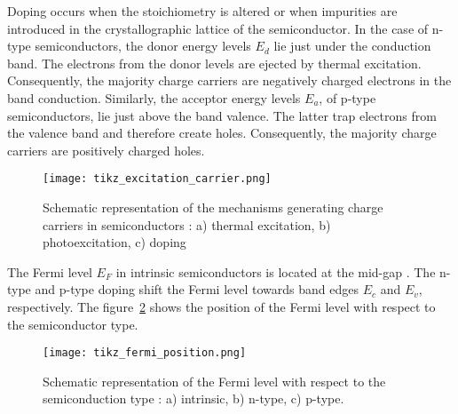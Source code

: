     Doping occurs when the stoichiometry is altered or when impurities are 
    introduced in the crystallographic lattice of the semiconductor. 
    In the case of n-type semiconductors, the donor energy levels $E_d$ lie just 
    under the conduction band. The electrons from the donor levels are ejected by 
    thermal excitation. 
    Consequently, the majority charge carriers are negatively charged electrons 
    in the band conduction. 
    Similarly, the acceptor energy levels $E_a$, of p-type semiconductors, 
    lie just above the band valence. 
    The latter trap electrons from the valence band and therefore create holes. 
    Consequently, the majority charge carriers are positively charged holes.

    \begin{figure}[h]
        \centering
        \texttt{[image: tikz\_excitation\_carrier.png]}
        \caption{Schematic representation of the mechanisms generating charge carriers in semiconductors \citep{finklea1983}: 
        a) thermal excitation, b) photoexcitation, c) doping}
        \label{fig_excitation_carrier}
    \end{figure}

    The Fermi level $E_F$ in intrinsic semiconductors is located at the mid-gap . 
    The n-type and p-type doping shift the Fermi level towards band edges 
    $E_c$ and $E_v$, respectively. 
    The figure~\ref{fig_fermi_position} shows the position of the Fermi level 
    with respect to the semiconductor type. 

    \begin{figure}[H]
        \centering
        \texttt{[image: tikz\_fermi\_position.png]}
        \caption{Schematic representation of the Fermi level with respect to the 
        semiconduction type \citep{finklea1983}: a) intrinsic, b) n-type, c) p-type.}
        \label{fig_fermi_position}
    \end{figure}



